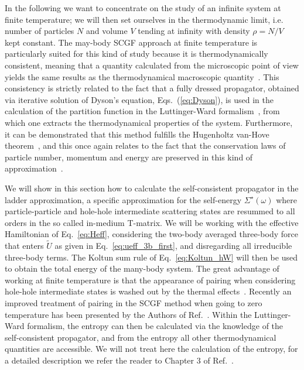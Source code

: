 In the following we want to concentrate on the study of an infinite system at finite temperature; we will then set ourselves in the thermodynamic limit, i.e. number of particles $N$ and volume $V$ tending at infinity with density $\rho=N/V$ kept constant. The may-body SCGF approach at finite temperature is particularly suited for this kind of study because it is thermodynamically consistent, meaning that a quantity calculated from the microscopic point of view yields the same results as the thermodynamical macroscopic quantity~\cite{ch11_Baym1962}. This consistency is strictly related to the fact that a fully dressed propagator, obtained via iterative solution of Dyson's equation, Eqs.~(\ref{eq:Dyson}), is used in the calculation of the partition function in the Luttinger-Ward formalism~\cite{ch11_Luttinger1960}, from which one extracts the thermodynamical properties of the system. Furthermore, it can be demonstrated that this method fulfills the Hugenholtz van-Hove theorem~\cite{ch11_Hugenholtz1958}, and this once again relates to the fact that the conservation laws of particle number, momentum and energy are preserved in this kind of approximation~\cite{ch11_Baym1961,ch11_Baym1962}.

We will show in this section how to calculate the self-consistent propagator in the ladder approximation, a specific approximation for the self-energy $\Sigma^\star(\omega)$ where particle-particle and hole-hole intermediate scattering states are resummed to all orders in the so called in-medium T-matrix. We will be working with the effective Hamiltonian of Eq.~\eqref{eq:Heff}, considering the two-body averaged three-body force that enters $\widetilde U$ as given in Eq.~\eqref{eq:ueff_3b_first}, and disregarding all irreducible three-body terms. The Koltun sum rule of Eq.~\eqref{eq:Koltun_hW} will then be used to obtain the total energy of the many-body system. The great advantage of working at finite temperature is that the appearance of pairing when considering hole-hole intermediate states is washed out by the thermal effects~\cite{ch11_Alm1996}. Recently an improved treatment of pairing in the SCGF method when going to zero temperature has been presented by the Authors of Ref.~\cite{ch11_ding2016}. Within the Luttinger-Ward formalism, the entropy can then be calculated via the knowledge of the self-consistent propagator, and from the entropy all other thermodynamical quantities are accessible. We will not treat here the calculation of the entropy, for a detailed description we refer the reader to Chapter 3 of Ref.~\cite{ch11_Rios2007PhD}.

